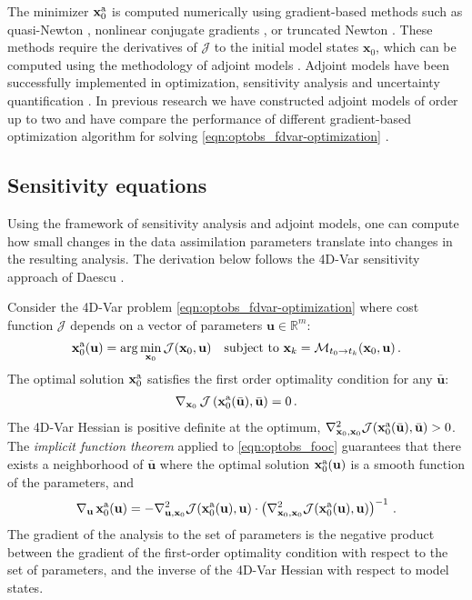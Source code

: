 \documentclass{article}
\newcommand{\Jfunc}{\mathcal J }
\newcommand{\Model}{\mathcal M}
\newcommand{\x}{   \mathbf{x} }
\newcommand{\xa}{ \mathbf{x}^{\rm a} }
\renewcommand{\u}{ \mathbf{u} }
\begin{document}
The minimizer $\xa_0$ is computed numerically using gradient-based methods such as
quasi-Newton \cite{dennis1977quasi}, nonlinear conjugate gradients \cite{dai1999nonlinear}, or truncated Newton \cite{schlick1992tnpack}.
These methods require the derivatives of $\Jfunc$ to the initial model states $\x_0$,
which can be computed using the methodology of adjoint models \cite{cacuci1981sensitivity,Wang_1992}.
Adjoint models have been successfully implemented in optimization, sensitivity analysis and uncertainty quantification
\cite{sandu2008discrete,SanduADJ_2005,Cioaca_2011}.
In previous research we have constructed adjoint models of order up to two and have
compare the performance of different gradient-based optimization algorithm for solving \eqref{eqn:optobs_fdvar-optimization} \cite{Cioaca_2011}.

\subsection{Sensitivity equations}


Using the framework of sensitivity analysis and adjoint models, one can compute 
how small changes in the data assimilation parameters translate into changes in the resulting analysis.
The derivation below follows the 4D-Var sensitivity approach of Daescu \cite{Daescu_2008}.

Consider the 4D-Var problem \eqref{eqn:optobs_fdvar-optimization} where cost function $\Jfunc$
depends on a vector of parameters $\u \in \mathbb{R}^m$:
\[
 \xa_0(\u) = \arg\min_{\x_0} \Jfunc(\x_0,\u) \quad \textnormal{subject to }\x_k = \Model_{t_0 \rightarrow t_k} (\x_0,\u)\,.
 \]
The optimal solution $\xa_0$ satisfies the first order optimality condition for any $\bar{\u}$:
\begin{align}
 \nabla_{\x_0} \, \Jfunc\left(\xa_0(\bar{\u}),\bar{\u}\right) = 0 \,.
\label{eqn:optobs_fooc}
\end{align}
The 4D-Var Hessian is positive definite at the optimum, $\nabla_{\x_0,\x_0}^2 \Jfunc(\xa_0(\bar{\u}),\bar{\u})>0$.
The \textit{implicit function theorem} \cite{krantz2002implicit} applied to \eqref{eqn:optobs_fooc} 
guarantees that there exists a neighborhood of $\bar{\u}$ where the optimal solution $\xa_0(\u)$ is 
a smooth function of the parameters, and 
\begin{align}
\label{eqn:dxa-du}
 \nabla_\u\, \xa_0(\u) = -\nabla_{\u,\x_0}^2 \Jfunc (\xa_0(\u), \u) \cdot \left(\nabla_{\x_0,\x_0}^2 \Jfunc(\xa_0(\u), \u)\right) ^{-1}\,. 
\end{align}
The gradient of the analysis to the set of parameters is the negative product
between the gradient of the first-order optimality condition with respect to the set of parameters,
and the inverse of the 4D-Var Hessian with respect to model states. 
\end{document}
